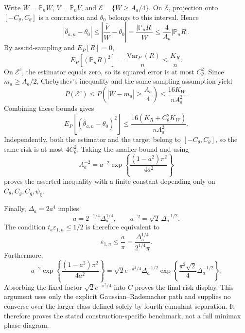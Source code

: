 Write \(\overline W=\mathbb P_nW\), \(\overline V=\mathbb P_nV\), and \(\mathcal E=\{\overline W\geq A_a/4\}\).  On \(\mathcal E\), projection onto \([-C_{\theta},C_{\theta}]\) is a contraction and \(\theta_0\) belongs to this interval.  Hence
\[
 \left|\widehat\theta_{a,n}-\theta_0\right|
 \leq\left|\frac{\overline V}{\overline W}-\theta_0\right|
 =\frac{|\mathbb P_nR|}{\overline W}
 \leq\frac{4}{A_a}|\mathbb P_nR|.
\]
By \(\text{ass:iid-sampling}\) and \(E_P[R]=0\),
\[
 E_P[(\mathbb P_nR)^2]
 =\frac{\operatorname{Var}_P(R)}{n}
 \leq\frac{K_R}{n}.
\]
On \(\mathcal E^c\), the estimator equals zero, so its squared error is at most \(C_{\theta}^2\).  Since \(m_a\geq A_a/2\), Chebyshev's inequality and the same sampling assumption yield
\[
 P(\mathcal E^c)
 \leq P\!\left(|\overline W-m_a|\geq\frac{A_a}{4}\right)
 \leq\frac{16K_W}{nA_a^2}.
\]
Combining these bounds gives
\[
 E_P[(\widehat\theta_{a,n}-\theta_0)^2]
 \leq\frac{16(K_R+C_{\theta}^2K_W)}{nA_a^2}.
\]
Independently, both the estimator and the target belong to \([-C_{\theta},C_{\theta}]\), so the same risk is at most \(4C_{\theta}^2\).  Taking the smaller bound and using
\[
 A_a^{-2}
 =a^{-2}\exp\!\left\{\frac{(1-a^2)\pi^2}{4a^2}\right\}
\]
proves the asserted inequality with a finite constant depending only on \(C_{\theta},C_g,C_q,\psi_{\xi}\).

Finally, \(\Delta_a=2a^4\) implies
\[
 a=2^{-1/4}\Delta_a^{1/4},
 \qquad
 a^{-2}=\sqrt2\,\Delta_a^{-1/2}.
\]
The condition \(t_a\varepsilon_{1,n}\leq1/2\) is therefore equivalent to
\[
 \varepsilon_{1,n}
 \leq\frac{a}{\pi}
 =\frac{\Delta_a^{1/4}}{2^{1/4}\pi}.
\]
Furthermore,
\[
 a^{-2}\exp\!\left\{\frac{(1-a^2)\pi^2}{4a^2}\right\}
 =\sqrt2e^{-\pi^2/4}\Delta_a^{-1/2}
 \exp\!\left\{\frac{\pi^2\sqrt2}{4}\Delta_a^{-1/2}\right\}.
\]
Absorbing the fixed factor \(\sqrt2e^{-\pi^2/4}\) into \(C\) proves the final risk display.  This argument uses only the explicit Gaussian--Rademacher path and supplies no converse over the larger class defined solely by fourth-cumulant separation.  It therefore proves the stated construction-specific benchmark, not a full minimax phase diagram.